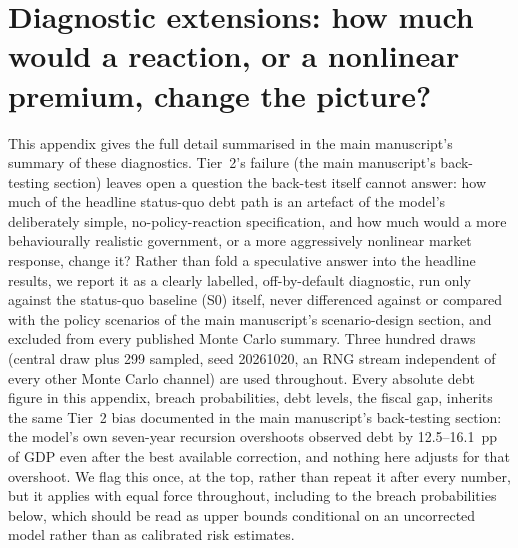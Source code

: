 \documentclass[11pt,a4paper]{article}
\begin{document}
\section{Diagnostic extensions: how much would a reaction, or a nonlinear premium, change the picture?}
\label{app:d4}

\noindent This appendix gives the full detail summarised in the main manuscript's summary of these diagnostics. Tier~2's failure (the main manuscript's back-testing section) leaves open a question the back-test itself cannot answer: how much of the headline status-quo debt path is an artefact of the model's deliberately simple, no-policy-reaction specification, and how much would a more behaviourally realistic government, or a more aggressively nonlinear market response, change it? Rather than fold a speculative answer into the headline results, we report it as a clearly labelled, off-by-default diagnostic, run only against the status-quo baseline (\textsc{S0}) itself, never differenced against or compared with the policy scenarios of the main manuscript's scenario-design section, and excluded from every published Monte Carlo summary. Three hundred draws (central draw plus 299 sampled, seed 20261020, an RNG stream independent of every other Monte Carlo channel) are used throughout. Every absolute debt figure in this appendix, breach probabilities, debt levels, the fiscal gap, inherits the same Tier~2 bias documented in the main manuscript's back-testing section: the model's own seven-year recursion overshoots observed debt by 12.5--16.1~pp of GDP even after the best available correction, and nothing here adjusts for that overshoot. We flag this once, at the top, rather than repeat it after every number, but it applies with equal force throughout, including to the breach probabilities below, which should be read as upper bounds conditional on an uncorrected model rather than as calibrated risk estimates.
\end{document}
